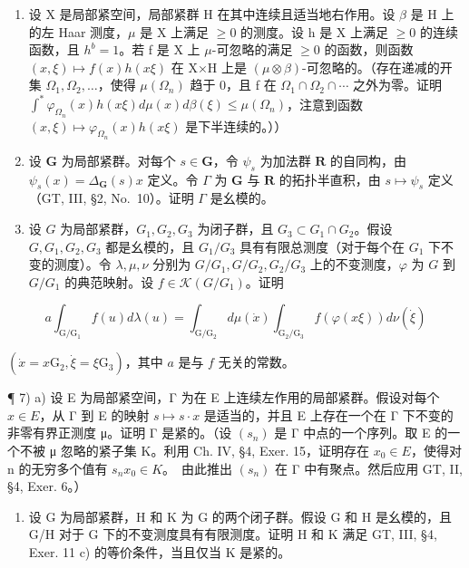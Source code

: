\begin{enumerate}
\def\labelenumi{\arabic{enumi})}
\setcounter{enumi}{3}
\item
  设 X 是局部紧空间，局部紧群 H 在其中连续且适当地右作用。设 \(\beta\) 是 H 上的左 Haar 测度，\(\mu\) 是 X 上满足 \(\geqslant0\) 的测度。设 h 是 X 上满足 \(\geqslant0\) 的连续函数，且 \(h^{b}=1\)。若 f 是 X 上 \(\mu\)-可忽略的满足 \(\geqslant0\) 的函数，则函数 \((x,\xi)\mapsto f(x)h(x\xi)\) 在 X×H 上是 \((\mu\otimes\beta)\)-可忽略的。（存在递减的开集 \(\Omega_{1},\Omega_{2},\ldots\)，使得 \(\mu(\Omega_{n})\) 趋于 0，且 f 在 \(\Omega_{1}\cap\Omega_{2}\cap\cdots\) 之外为零。证明 \(\int^{*}\varphi_{\Omega_{n}}(x)h(x\xi)d\mu(x)d\beta(\xi)\leqslant\mu(\Omega_{n})\)，注意到函数 \((x,\xi)\mapsto\varphi_{\Omega_{n}}(x)h(x\xi)\) 是下半连续的。））
\item
  设 \(\mathbf{G}\) 为局部紧群。对每个 \(s \in \mathbf{G}\)，令 \(\psi_s\) 为加法群 \(\mathbf{R}\) 的自同构，由 \(\psi_s(x) = \Delta_{\mathbf{G}}(s)x\) 定义。令 \(\Gamma\) 为 \(\mathbf{G}\) 与 \(\mathbf{R}\) 的拓扑半直积，由 \(s \mapsto \psi_s\) 定义（GT, III, §2, No.~10）。证明 \(\Gamma\) 是幺模的。
\item
  设 \(G\) 为局部紧群，\(G_1, G_2, G_3\) 为闭子群，且 \(G_3 \subset G_1 \cap G_2\)。假设 \(G, G_1, G_2, G_3\) 都是幺模的，且 \(G_1 / G_3\) 具有有限总测度（对于每个在 \(G_1\) 下不变的测度）。令 \(\lambda, \mu, \nu\) 分别为 \(G / G_1, G / G_2, G_2 / G_3\) 上的不变测度，\(\varphi\) 为 \(G\) 到 \(G / G_1\) 的典范映射。设 \(f \in \mathcal{K}(G / G_1)\)。证明
\end{enumerate}

\[
a \int_ {\mathrm{G} / \mathrm{G} _ {1}} f (u) d \lambda (u) = \int_ {\mathrm{G} / \mathrm{G} _ {2}} d \mu (\dot {x}) \int_ {\mathrm{G} _ {2} / \mathrm{G} _ {3}} f (\varphi (x \xi)) d \nu (\dot {\xi})
\]

\((\dot{x} = x\mathrm{G}_{2}, \dot{\xi} = \xi \mathrm{G}_{3})\)，其中 \(a\) 是与 \(f\) 无关的常数。

¶ 7) a) 设 E 为局部紧空间，Γ 为在 E 上连续左作用的局部紧群。假设对每个 \(x \in E\)，从 Γ 到 E 的映射 \(s \mapsto s \cdot x\) 是适当的，并且 E 上存在一个在 Γ 下不变的非零有界正测度 μ。证明 Γ 是紧的。（设 \((s_n)\) 是 Γ 中点的一个序列。取 E 的一个不被 μ 忽略的紧子集 K。利用 Ch. IV, §4, Exer. 15，证明存在 \(x_0 \in E\)，使得对 n 的无穷多个值有 \(s_n x_0 \in K\)。~由此推出 \((s_n)\) 在 Γ 中有聚点。然后应用 GT, II, §4, Exer. 6。）

\begin{enumerate}
\def\labelenumi{\alph{enumi})}
\setcounter{enumi}{1}
\tightlist
\item
  设 G 为局部紧群，H 和 K 为 G 的两个闭子群。假设 G 和 H 是幺模的，且 G/H 对于 G 下的不变测度具有有限测度。证明 H 和 K 满足 GT, III, §4, Exer. 11 c) 的等价条件，当且仅当 K 是紧的。
\end{enumerate}

